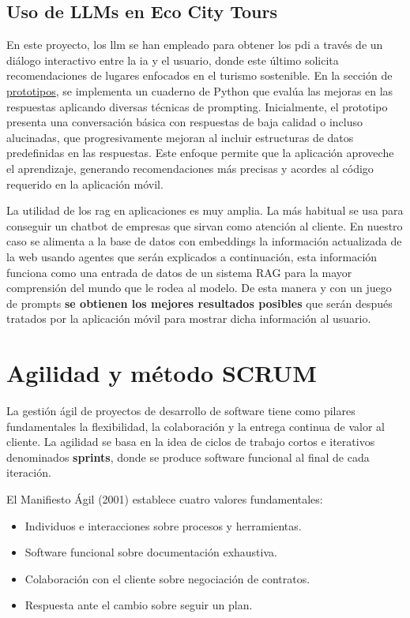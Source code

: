 	
	\subsection{Uso de LLMs en Eco City Tours}
	En este proyecto, los \acrlong{llm} se han empleado para obtener los \acrfull{pdi} a través de un diálogo interactivo entre la \acrlong{ia} y el usuario, donde este último solicita recomendaciones de lugares enfocados en el turismo sostenible. En la sección de \href{https://github.com/fps1001/TFGII_FPisot/tree/main/project-prototypes/README.md}{prototipos}, se implementa un cuaderno de Python que evalúa las mejoras en las respuestas aplicando diversas técnicas de prompting\cite{promptingguide}. Inicialmente, el prototipo presenta una conversación básica con respuestas de baja calidad o incluso alucinadas, que progresivamente mejoran al incluir estructuras de datos predefinidas en las respuestas. Este enfoque permite que la aplicación aproveche el aprendizaje, generando recomendaciones más precisas y acordes al código requerido en la aplicación móvil.
	
	La utilidad de los \acrfull{rag} en aplicaciones es muy amplia. La más habitual se usa para conseguir un chatbot de empresas que sirvan como atención al cliente. 
	En nuestro caso se alimenta a la base de datos con embeddings la información actualizada de la web usando agentes que serán explicados a continuación, esta información funciona como una entrada de datos de un sistema RAG para la mayor comprensión del mundo que le rodea al modelo. De esta manera y con un juego de prompts \textbf{se obtienen los mejores resultados posibles} que serán después tratados por la aplicación móvil para mostrar dicha información al usuario.

\section{Agilidad y método SCRUM}
La gestión ágil de proyectos de desarrollo de software tiene como pilares fundamentales la flexibilidad, la colaboración y la entrega continua de valor al cliente\cite{agile_alliance}. La agilidad se basa en la idea de ciclos de trabajo cortos e iterativos denominados \textbf{sprints}, donde se produce software funcional al final de cada iteración.

El Manifiesto Ágil (2001) establece cuatro valores fundamentales:
\begin{itemize}
\item Individuos e interacciones sobre procesos y herramientas.
\item Software funcional sobre documentación exhaustiva.
\item Colaboración con el cliente sobre negociación de contratos.
\item Respuesta ante el cambio sobre seguir un plan.
\end{itemize}


